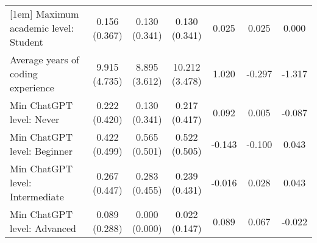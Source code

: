 \begin{table}[ht]
{\begin{tabular}{lcccccc}
[1em]
Maximum academic level: Student & \shortstack{0.156\\(0.367)} & \shortstack{0.130\\(0.341)} & \shortstack{0.130\\(0.341)} & \shortstack{0.025\\\relax[0.736]} & \shortstack{0.025\\\relax[0.736]} & \shortstack{0.000\\\relax[1.000]}\\
[1em]
Average years of coding experience & \shortstack{9.915\\(4.735)} & \shortstack{8.895\\(3.612)} & \shortstack{10.212\\(3.478)} & \shortstack{1.020\\\relax[0.250]} & \shortstack{-0.297\\\relax[0.733]} & \shortstack{-1.317\\\relax[0.078]}\\
[1em]
Min ChatGPT level: Never & \shortstack{0.222\\(0.420)} & \shortstack{0.130\\(0.341)} & \shortstack{0.217\\(0.417)} & \shortstack{0.092\\\relax[0.255]} & \shortstack{0.005\\\relax[0.956]} & \shortstack{-0.087\\\relax[0.276]}\\
[1em]
Min ChatGPT level: Beginner & \shortstack{0.422\\(0.499)} & \shortstack{0.565\\(0.501)} & \shortstack{0.522\\(0.505)} & \shortstack{-0.143\\\relax[0.176]} & \shortstack{-0.100\\\relax[0.347]} & \shortstack{0.043\\\relax[0.680]}\\
[1em]
Min ChatGPT level: Intermediate & \shortstack{0.267\\(0.447)} & \shortstack{0.283\\(0.455)} & \shortstack{0.239\\(0.431)} & \shortstack{-0.016\\\relax[0.867]} & \shortstack{0.028\\\relax[0.766]} & \shortstack{0.043\\\relax[0.639]}\\
[1em]
Min ChatGPT level: Advanced & \shortstack{0.089\\(0.288)} & \shortstack{0.000\\(0.000)} & \shortstack{0.022\\(0.147)} & \shortstack{0.089\\\relax[0.039]} & \shortstack{0.067\\\relax[0.163]} & \shortstack{-0.022\\\relax[0.320]}\\

\end{tabular}}
\end{table}
